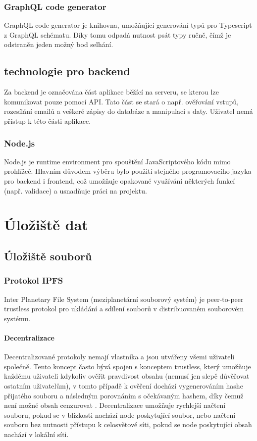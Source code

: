 \documentclass[12pt, a4paper,
 twoside,        %
 openright
]{report}
\begin{document}
\subsection{GraphQL code generator}
GraphQL code generator je knihovna, umožňující generování typů pro Typescript z GraphQL schématu. Díky tomu odpadá nutnost psát typy ručně, čímž je odstraněn jeden možný bod selhání. \cite{graphqlCodeGeneratorDocs}
\section{technologie pro backend}
Za backend je označována část aplikace běžící na serveru, se kterou lze komunikovat pouze pomocí API. Tato část se stará o např. ověřování vstupů, rozesílání emailů a veškeré zápisy do databáze a manipulaci s daty. Uživatel nemá přístup k této části aplikace.
\cite{whatIsFrontend} %
\subsection{Node.js}
Node.js je runtime environment pro spouštění JavaScriptového kódu mimo prohlížeč. Hlavním důvodem výběru bylo použití stejného programovacího jazyka pro backend i frontend, což umožňuje opakované využívání některých funkcí (např. validace) a usnadňuje práci na projektu. \cite{aboutNodeJS}

\chapter{Úložiště dat}
\section{Úložiště souborů}
\subsection{Protokol IPFS}\label{subsection:IPFS}
Inter Planetary File System (meziplanetární souborový systém) je peer-to-peer trustless protokol pro ukládání a sdílení souborů v distribuovaném souborovém systému. \cite{IPFSDocs}
\subsubsection{Decentralizace}
Decentralizované protokoly nemají vlastníka a jsou utvářeny všemi uživateli společně. Tento koncept často bývá spojen s konceptem trustless, který umožňuje každému uživateli kdykoliv ověřit pravdivost obsahu (nemusí jen slepě důvěřovat ostatním uživatelům), v tomto případě k ověření dochází vygenerováním hashe přijatého souboru a následným porovnáním s očekávaným hashem, díky čemuž není možné obsah cenzurovat \cite{decentralizedVsTrustless}. Decentralizace umožňuje rychlejší načtení souboru, pokud se v blízkosti nachází node poskytující soubor, nebo načtení souboru bez nutnosti přístupu k celosvětové síti, pokud se node poskytující obsah nachází v lokální síti. \cite{decentralizedAndDistributedNetworks}\cite{decentralizedAndTrustless}
\end{document}
